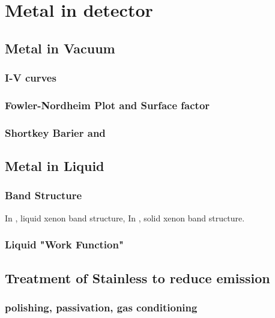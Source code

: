\chapter{Metal in detector}
\label{Chapter9}
\section{Metal in Vacuum}
\subsection{I-V curves}
\subsection{Fowler-Nordheim Plot and Surface factor}
\subsection{Shortkey Barier and}
\section{Metal in Liquid}
\subsection{Band Structure}
In \cite{Steinberger1973}, liquid xenon band structure, In \cite{Reilly1967}, solid xenon band structure. 
\subsection{Liquid "Work Function"}
\subsection{}
\section{Treatment of Stainless to reduce emission}
\subsection{polishing, passivation, gas conditioning}

